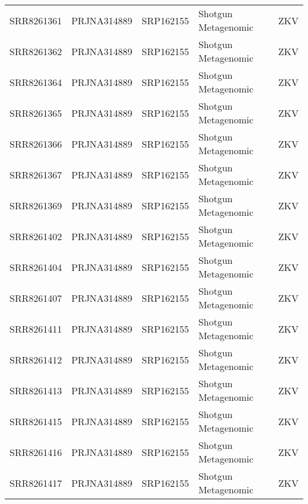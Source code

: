 \begin{scriptsize}
\begin{center}
\begin{longtable}{@{}lllll@{}}
SRR8261361 & PRJNA314889 & SRP162155 & Shotgun Metagenomic   & ZKV      \\
SRR8261362 & PRJNA314889 & SRP162155 & Shotgun Metagenomic   & ZKV      \\
SRR8261364 & PRJNA314889 & SRP162155 & Shotgun Metagenomic   & ZKV      \\
SRR8261365 & PRJNA314889 & SRP162155 & Shotgun Metagenomic   & ZKV      \\
SRR8261366 & PRJNA314889 & SRP162155 & Shotgun Metagenomic   & ZKV      \\
SRR8261367 & PRJNA314889 & SRP162155 & Shotgun Metagenomic   & ZKV      \\
SRR8261369 & PRJNA314889 & SRP162155 & Shotgun Metagenomic   & ZKV      \\
SRR8261402 & PRJNA314889 & SRP162155 & Shotgun Metagenomic   & ZKV      \\
SRR8261404 & PRJNA314889 & SRP162155 & Shotgun Metagenomic   & ZKV      \\
SRR8261407 & PRJNA314889 & SRP162155 & Shotgun Metagenomic   & ZKV      \\
SRR8261411 & PRJNA314889 & SRP162155 & Shotgun Metagenomic   & ZKV      \\
SRR8261412 & PRJNA314889 & SRP162155 & Shotgun Metagenomic   & ZKV      \\
SRR8261413 & PRJNA314889 & SRP162155 & Shotgun Metagenomic   & ZKV      \\
SRR8261415 & PRJNA314889 & SRP162155 & Shotgun Metagenomic   & ZKV      \\
SRR8261416 & PRJNA314889 & SRP162155 & Shotgun Metagenomic   & ZKV      \\
SRR8261417 & PRJNA314889 & SRP162155 & Shotgun Metagenomic   & ZKV    
\end{longtable}

\end{center}
\end{scriptsize}
